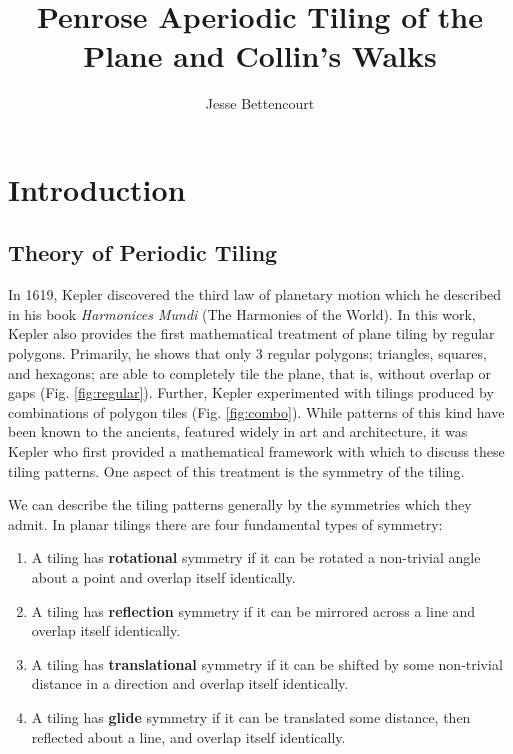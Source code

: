 \documentclass[]{article}
\title{Penrose Aperiodic Tiling of the Plane and Collin's Walks}
\author{Jesse Bettencourt}
\begin{document}
\maketitle



\section{Introduction}
\subsection{Theory of Periodic Tiling}

In 1619, Kepler discovered the third law of planetary motion which he described in his book \textit{Harmonices Mundi} (The Harmonies of the World). In this work, Kepler also provides the first mathematical treatment of plane tiling by regular polygons. Primarily, he shows that only 3 regular polygons; triangles, squares, and hexagons; are able to completely tile the plane, that is, without overlap or gaps (Fig. \ref{fig:regular}). Further, Kepler experimented with tilings produced by combinations of polygon tiles (Fig. \ref{fig:combo}). While patterns of this kind have been known to the ancients, featured widely in art and architecture, it was Kepler who first provided a mathematical framework with which to discuss these tiling patterns. One aspect of this treatment is the symmetry of the tiling. 

We can describe the tiling patterns generally by the symmetries which they admit. In planar tilings there are four fundamental types of symmetry: 
\begin{enumerate}
\item A tiling has \textbf{rotational} symmetry if it can be rotated a non-trivial angle about a point and overlap itself identically.
\item A tiling has \textbf{reflection} symmetry if it can be mirrored across a line and overlap itself identically. 
\item A tiling has \textbf{translational} symmetry if it can be shifted by some non-trivial distance in a direction and overlap itself identically.
\item A tiling has \textbf{glide} symmetry if it can be translated some distance, then reflected about a line, and overlap itself identically.
\end{enumerate}
\end{document}
